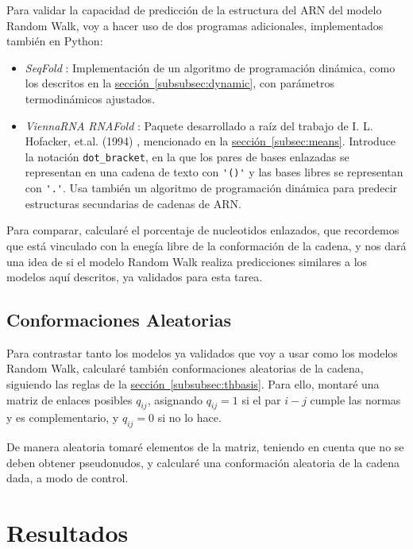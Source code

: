 \documentclass[a4paper,11pt,titlepage]{article}
\newcommand{\nr}[2][sección]{\hyperref[#2]{#1~\ref{#2}}}
\theoremstyle{definition}
\begin{document}
Para validar la capacidad de predicción de la estructura del ARN del modelo Random Walk, voy a hacer uso de dos programas adicionales, implementados también en Python:

\begin{itemize}
    \item \textit{SeqFold} \cite{seqfold}: Implementación de un algoritmo de programación dinámica, como los descritos en la \nr[sección]{subsubsec:dynamic}, con parámetros termodinámicos ajustados.
    \item \textit{ViennaRNA RNAFold} \cite{viennarna}: Paquete desarrollado a raíz del trabajo de  I. L. Hofacker, et.al. (1994) \cite{hofacker}, mencionado en la \nr[sección]{subsec:means}. Introduce la notación \verb|dot_bracket|, en la que los pares de bases enlazadas se representan en una cadena de texto con \verb|'()'| y las bases libres se representan con \verb|'.'|. Usa también un algoritmo de programación dinámica para predecir estructuras secundarias de cadenas de ARN.
\end{itemize}

Para comparar, calcularé el porcentaje de nucleotidos enlazados, que recordemos que está vinculado con la enegía libre de la conformación de la cadena, y nos dará una idea de si el modelo Random Walk realiza predicciones similares a los modelos aquí descritos, ya validados para esta tarea.

\subsection{Conformaciones Aleatorias}\label{subsec:randomconf}

Para contrastar tanto los modelos ya validados que voy a usar como los modelos Random Walk, calcularé también conformaciones aleatorias de la cadena, siguiendo las reglas de la \nr[sección]{subsubsec:thbasis}. Para ello, montaré una matriz de enlaces posibles $q_{ij}$, asignando $q_{ij} = 1$ si el par $i-j$ cumple las normas y es complementario, y $q_{ij} = 0$ si no lo hace. 

De manera aleatoria tomaré elementos de la matriz, teniendo en cuenta que no se deben obtener pseudonudos, y calcularé una conformación aleatoria de la cadena dada, a modo de control.

\section{Resultados}\label{sec:res}
\end{document}
